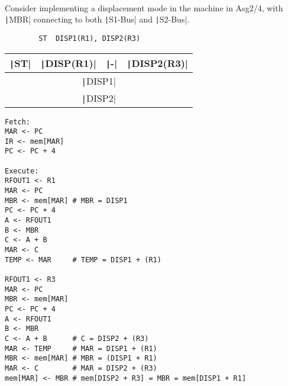 \documentclass[answers]{exam}
\begin{document}
\begin{questions}
    \newpage

     \\
    Consider implementing a displacement mode in the machine in Asg2/4, with \texttt|MBR| connecting to both \texttt|S1-Bus| and \texttt|S2-Bus|.

    \begin{center}
        \begin{verbatim}
        ST  DISP1(R1), DISP2(R3)
        \end{verbatim}
    \end{center}

    \begin{table}[htb]
        \centering
        \setlength{\tabcolsep}{30pt}
        \begin{tabular}{|c|c|c|c|}
            \hline
            \texttt|ST|
             & \texttt|DISP(R1)|
             & \texttt|-|
             & \texttt|DISP2(R3)|                \\ \hline\hline
            \multicolumn{4}{|c|}{\texttt|DISP1|} \\ \hline
            \multicolumn{4}{|c|}{\texttt|DISP2|} \\ \hline
        \end{tabular}
    \end{table}

    \begin{solution}
        \begin{verbatim}
Fetch:
MAR <- PC
IR <- mem[MAR]
PC <- PC + 4

Execute: 
RFOUT1 <- R1
MAR <- PC
MBR <- mem[MAR] # MBR = DISP1
PC <- PC + 4
A <- RFOUT1
B <- MBR
C <- A + B
MAR <- C
TEMP <- MAR     # TEMP = DISP1 + (R1)

RFOUT1 <- R3
MAR <- PC
MBR <- mem[MAR]
PC <- PC + 4
A <- RFOUT1
B <- MBR
C <- A + B      # C = DISP2 + (R3)
MAR <- TEMP     # MAR = DISP1 + (R1)
MBR <- mem[MAR] # MBR = (DISP1 + R1)
MAR <- C        # MAR = DISP2 + (R3)
mem[MAR] <- MBR # mem[DISP2 + R3] = MBR = mem[DISP1 + R1]
        \end{verbatim}
    \end{solution}

\end{questions}
\end{document}

